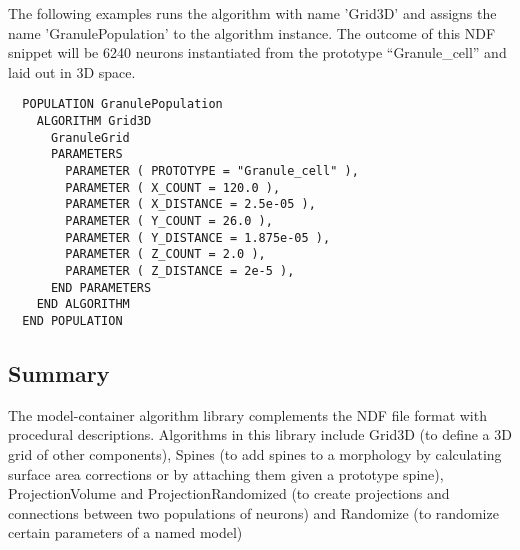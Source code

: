 \documentclass[12pt]{article}
\begin{document}
The following examples runs the algorithm with name 'Grid3D' and
assigns the name 'GranulePopulation' to the algorithm instance.  The
outcome of this NDF snippet will be 6240 neurons instantiated from the
prototype ``Granule\_cell'' and laid out in 3D space.

\begin{center}
\begin{verbatim}
  POPULATION GranulePopulation
    ALGORITHM Grid3D
      GranuleGrid
      PARAMETERS
        PARAMETER ( PROTOTYPE = "Granule_cell" ),
        PARAMETER ( X_COUNT = 120.0 ),
        PARAMETER ( X_DISTANCE = 2.5e-05 ),
        PARAMETER ( Y_COUNT = 26.0 ),
        PARAMETER ( Y_DISTANCE = 1.875e-05 ),
        PARAMETER ( Z_COUNT = 2.0 ),
        PARAMETER ( Z_DISTANCE = 2e-5 ),
      END PARAMETERS
    END ALGORITHM
  END POPULATION
\end{verbatim}
\end{center}

\subsection*{Summary}

The model-container algorithm library complements the NDF file format
with procedural descriptions.  Algorithms in this library include
Grid3D (to define a 3D grid of other components), Spines (to add
spines to a morphology by calculating surface area corrections or by
attaching them given a prototype spine), ProjectionVolume and
ProjectionRandomized (to create projections and connections between
two populations of neurons) and Randomize (to randomize certain
parameters of a named model)
\end{document}
